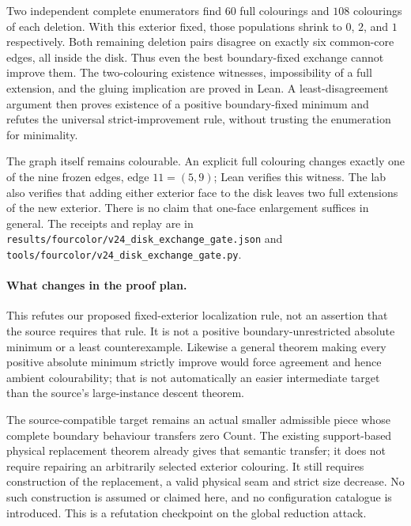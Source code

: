 Two independent complete enumerators find $60$ full colourings and $108$
colourings of each deletion. With this exterior fixed, those populations
shrink to $0$, $2$, and $1$ respectively. Both remaining deletion pairs
disagree on exactly six common-core edges, all inside the disk. Thus even
the best boundary-fixed exchange cannot improve them. The two-colouring
existence witnesses, impossibility of a full extension, and the gluing
implication are proved in Lean. A least-disagreement argument then proves
existence of a positive boundary-fixed minimum and refutes the universal
strict-improvement rule, without trusting the enumeration for minimality.

The graph itself remains colourable. An explicit full colouring changes
exactly one of the nine frozen edges, edge $11=(5,9)$; Lean verifies this
witness. The lab also verifies that adding either exterior face to the
disk leaves two full extensions of the new exterior. There is no claim
that one-face enlargement suffices in general.
The receipts and replay are in
\texttt{results/fourcolor/v24\_disk\_exchange\_gate.json} and
\texttt{tools/fourcolor/v24\_disk\_exchange\_gate.py}.

\paragraph{What changes in the proof plan.}
This refutes our proposed fixed-exterior localization rule, not an
assertion that the source requires that rule. It is not a positive
boundary-unrestricted absolute minimum or a least counterexample.
Likewise a general theorem making every positive absolute minimum
strictly improve would force agreement and hence ambient colourability;
that is not automatically an easier intermediate target than the source's
large-instance descent theorem.

The source-compatible target remains an actual smaller admissible piece
whose complete boundary behaviour transfers zero Count. The existing
support-based physical replacement theorem already gives that semantic
transfer; it does not require repairing an arbitrarily selected exterior
colouring. It still requires construction of the replacement, a valid
physical seam and strict size decrease. No such construction is assumed
or claimed here, and no configuration catalogue is introduced. This is a
refutation checkpoint on the global reduction attack.

